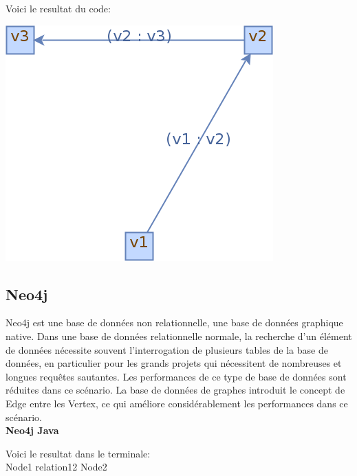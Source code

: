 \documentclass[12pt]{fphw}
\begin{document}


\newpage

Voici le resultat du code:\\
\begin{center}
	\includegraphics[width=0.6\columnwidth]{graph.png} %
\end{center}

\subsection*{Neo4j}
Neo4j est une base de données non relationnelle, une base de données graphique native. Dans une base de données relationnelle normale, la recherche d'un élément de données nécessite souvent l'interrogation de plusieurs tables de la base de données, en particulier pour les grands projets qui nécessitent de nombreuses et longues requêtes sautantes. Les performances de ce type de base de données sont réduites dans ce scénario. La base de données de graphes introduit le concept de Edge entre les Vertex, ce qui améliore considérablement les performances dans ce scénario.\\

\textbf{Neo4j Java}

Voici le resultat dans le terminale:\\
Node1 relation12 Node2
\end{document}
